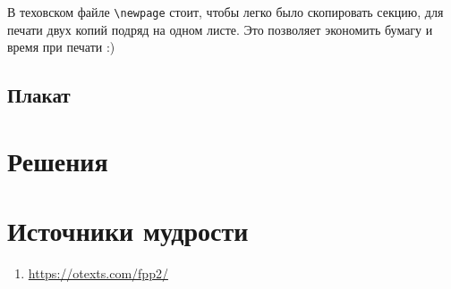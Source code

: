 \documentclass[12pt]{article}
\newcounter{problem}[section]
\theoremstyle{definition}
\begin{document}
В теховском файле \verb|\newpage| стоит, чтобы легко было скопировать секцию, для печати двух копий подряд на одном листе.
Это позволяет экономить бумагу и время при печати :)

\subsection{Плакат}






\renewenvironment{solution}[1]{%
         \vskip .5cm plus 2cm minus 0.1cm%
         {\bfseries \hyperlink{problem:#1}{#1.}}%
}%
{%
}%



\section{Решения}



\section{Источники мудрости}


\begin{enumerate}
\item \url{https://otexts.com/fpp2/}
\end{enumerate}

\printbibliography[heading=none]
\end{document}
